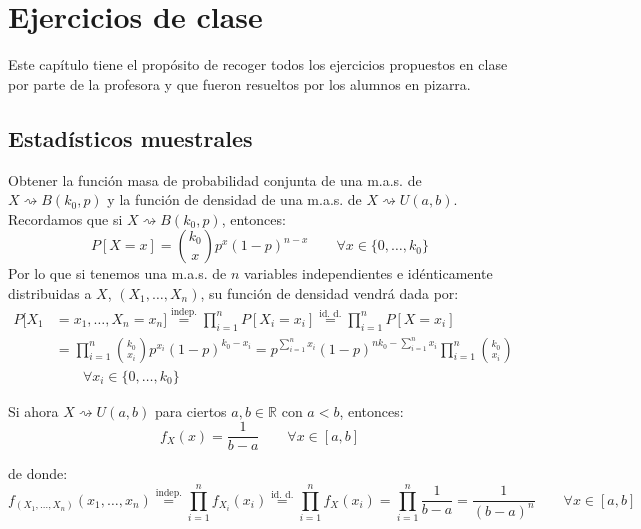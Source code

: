 \chapter{Ejercicios de clase}
\noindent
Este capítulo tiene el propósito de recoger todos los ejercicios propuestos en clase por parte de la profesora y que fueron resueltos por los alumnos en pizarra.

\section{Estadísticos muestrales}
\begin{ejercicio}
    Obtener la función masa de probabilidad conjunta de una m.a.s. de $X\rightsquigarrow B(k_0,p)$ y la función de densidad de una m.a.s. de $X\rightsquigarrow U(a,b)$.\\

    \noindent
    Recordamos que si $X\rightsquigarrow B(k_0, p)$, entonces:
    \begin{equation*}
        P[X = x] = \binom{k_0}{x} p^x{(1-p)}^{n-x} \qquad \forall x\in \{0,\ldots,k_0\}
    \end{equation*}
    Por lo que si tenemos una m.a.s. de $n$ variables independientes e idénticamente distribuidas a $X$, $(X_1, \ldots, X_n)$, su función de densidad vendrá dada por:
    \begin{align*}
        P[X_1 &= x_1, \ldots, X_n = x_n] \stackrel{\text{indep.}}{=} \prod_{i=1}^{n}P[X_i = x_i]\stackrel{\text{id. d.}}{=} \prod_{i=1}^{n} P[X=x_i] \\
              &= \prod_{i=1}^{n} \binom{k_0}{x_i} p^{x_i} {(1-p)}^{k_0-x_i} = p^{\sum\limits_{i=1}^{n}x_i} {(1-p)}^{nk_0 - \sum\limits_{i=1}^{n}x_i} \prod_{i=1}^{n}\binom{k_0}{x_i} \\
              & \qquad \forall x_i \in \{0,\ldots,k_0\}
    \end{align*}

    \noindent
    Si ahora $X\rightsquigarrow U(a,b)$ para ciertos $a,b\in \mathbb{R}$ con $a<b$, entonces:
    \begin{equation*}
        f_X(x) = \dfrac{1}{b-a} \qquad \forall x\in [a,b]
    \end{equation*}

    de donde:
    \begin{equation*}
        f_{(X_1, \ldots, X_n)}(x_1, \ldots, x_n) \stackrel{\text{indep.}}{=} \prod_{i=1}^{n} f_{X_i}(x_i)\stackrel{\text{id. d.}}{=} \prod_{i=1}^{n} f_X(x_i) = \prod_{i=1}^{n} \dfrac{1}{b-a} = \dfrac{1}{{(b-a)}^{n}} \qquad \forall x\in [a,b]
    \end{equation*}
\end{ejercicio}

